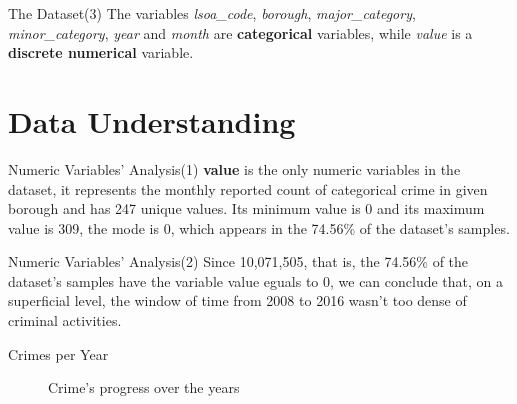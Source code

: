 \documentclass[12pt]{beamer}
\begin{document}
        \begin{frame}{The Dataset(3)}
            The variables \textit{lsoa\_code}, \textit{borough}, \textit{major\_category},
            \textit{minor\_category}, \textit{year} and \textit{month} are \textbf{categorical} variables,
            while \textit{value} is a \textbf{discrete numerical} variable.
        \end{frame}

    \section{Data Understanding} %
    \label{sec:data_understanding}
        \begin{frame}{Numeric Variables' Analysis(1)}
            \textbf{value} is the only numeric variables in the dataset, it represents the monthly reported
            count of categorical crime in given borough and has 247 unique values. Its minimum value is 0 and
            its maximum value is 309, the mode is 0, which appears in the 74.56\% of the dataset's samples.
        \end{frame}

        \begin{frame}{Numeric Variables' Analysis(2)}
            Since 10,071,505, that is, the 74.56\% of the dataset's samples have the variable value eguals to
            0, we can conclude that, on a superficial level, the window of time from 2008 to 2016 wasn't too
            dense of criminal activities.
        \end{frame}

        \begin{frame}{Crimes per Year}
            \begin{figure}
                \centering
                \caption{Crime's progress over the years}
            \end{figure}
        \end{frame}
\end{document}
